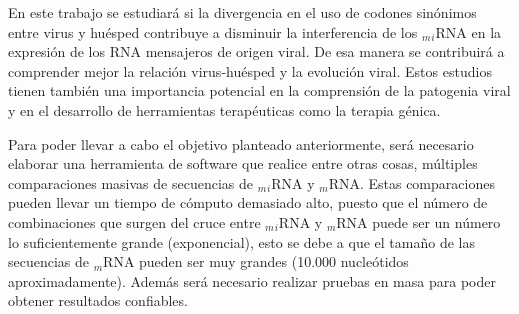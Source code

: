 \par En este trabajo se estudiará si la divergencia en el uso de codones sinónimos entre virus y huésped contribuye a disminuir la interferencia de los $_m$$_i$RNA en la expresión de los RNA mensajeros de origen viral. De esa manera se contribuirá a comprender mejor la relación virus-huésped y la evolución viral. Estos estudios tienen también una importancia potencial en la comprensión de la patogenia viral y en el desarrollo de herramientas terapéuticas como la terapia génica.

\par Para poder llevar a cabo el objetivo planteado anteriormente, será necesario elaborar una herramienta de software que realice entre otras cosas, múltiples comparaciones masivas de secuencias de $_m$$_i$RNA y $_m$RNA. Estas comparaciones pueden llevar un tiempo de cómputo demasiado alto, puesto que el número de combinaciones que surgen del cruce entre $_m$$_i$RNA y $_m$RNA puede ser un número lo suficientemente grande (exponencial), esto se debe a que el tamaño de las secuencias de $_m$RNA pueden ser muy grandes (10.000 nucleótidos aproximadamente). Además será necesario realizar pruebas en masa para poder obtener resultados confiables.